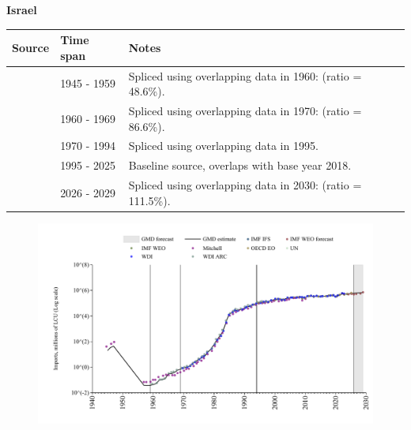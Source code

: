 \documentclass[12pt,a4paper,landscape]{article}
\begin{document}
\begin{adjustbox}{max totalsize={\paperwidth}{\paperheight},center}
\begin{minipage}[t][\textheight][t]{\textwidth}
\vspace*{0.5cm}
{}
\begin{center}
{\Large\bfseries Israel}
\end{center}
\vspace{0.5cm}
\begin{table}[H]
\centering
\small
\begin{tabular}{|l|l|l|}
\hline
\textbf{Source} & \textbf{Time span} & \textbf{Notes} \\
\hline
\rowcolor{white}\cite{Mitchell}& 1945 - 1959 &Spliced using overlapping data in 1960: (ratio = 48.6\%).\\
\rowcolor{lightgray}\cite{WDI_ARC}& 1960 - 1969 &Spliced using overlapping data in 1970: (ratio = 86.6\%).\\
\rowcolor{white}\cite{WDI}& 1970 - 1994 &Spliced using overlapping data in 1995.\\
\rowcolor{lightgray}\cite{OECD_EO}& 1995 - 2025 &Baseline source, overlaps with base year 2018.\\
\rowcolor{white}\cite{IMF_WEO_forecast}& 2026 - 2029 &Spliced using overlapping data in 2030: (ratio = 111.5\%).\\
\hline
\end{tabular}
\end{table}
\begin{figure}[H]
\centering
\includegraphics[width=\textwidth,height=0.6\textheight,keepaspectratio]{graphs/ISR_imports.pdf}
\end{figure}
\end{minipage}
\end{adjustbox}
\end{document}
